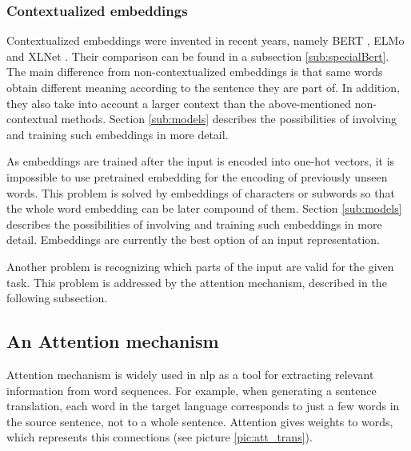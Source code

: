 \subsubsection{Contextualized embeddings}
Contextualized embeddings were invented in recent years, namely BERT \citep{Devlin2019}, ELMo \citep{Peters2018} and XLNet \citep{Yang2019}. %
Their comparison can be found in a subsection \ref{sub:specialBert}. The main difference from non-contextualized embeddings is that same words obtain different meaning according to the sentence they are part of. In addition, they also take into account a larger context than the above-mentioned non-contextual methods. Section \ref{sub:models} describes the possibilities of involving and training such embeddings in more detail.
\par
As embeddings are trained after the input is encoded into one-hot vectors, it is impossible to use pretrained embedding for the encoding of previously unseen words. This problem is solved by embeddings of characters or subwords so that the whole word embedding can be later compound of them. Section \ref{sub:models} describes the possibilities of involving and training such embeddings in more detail. Embeddings are currently the best option of an input representation. \par Another problem is recognizing which parts of the input are valid for the given task. This problem is addressed by the attention mechanism, described in the following subsection. 

\subsection{An Attention mechanism}
\label{sub:attention}
Attention mechanism \citep{Bahdanau} is widely used in \acrshort{nlp} as a tool for extracting relevant information from word sequences. For example, when generating a sentence translation, each word in the target language corresponds to just a few words in the source sentence, not to a whole sentence. Attention gives weights to words, which represents this connections (see picture \ref{pic:att_trans}).

